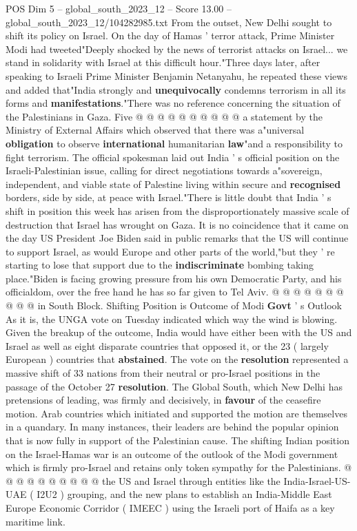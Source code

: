 \begin{textsample}{POS Dim 5 – global\_south\_2023\_12 – Score 13.00 – global\_south\_2023\_12/104282985.txt}
From the outset, New Delhi sought to shift its policy on Israel.
On the day of Hamas ' terror attack, Prime Minister Modi had tweeted"Deeply shocked by the news of terrorist attacks on Israel... we stand in solidarity with Israel at this difficult hour."Three days later, after speaking to Israeli Prime Minister Benjamin Netanyahu, he repeated these views and added that"India strongly and \textbf{unequivocally} condemns terrorism in all its forms and \textbf{manifestations}."There was no reference concerning the situation of the Palestinians in Gaza.
Five @ @ @ @ @ @ @ @ @ @ a statement by the Ministry of External Affairs which observed that there was a"universal \textbf{obligation} to observe \textbf{international} humanitarian \textbf{law}"and a responsibility to fight terrorism.
The official spokesman laid out India ' s official position on the Israeli-Palestinian issue, calling for direct negotiations towards a"sovereign, independent, and viable state of Palestine living within secure and \textbf{recognised} borders, side by side, at peace with Israel."There is little doubt that India ' s shift in position this week has arisen from the disproportionately massive scale of destruction that Israel has wrought on Gaza.
It is no coincidence that it came on the day US President Joe Biden said in public remarks that the US will continue to support Israel, as would Europe and other parts of the world,"but they ' re starting to lose that support due to the \textbf{indiscriminate} bombing taking place."Biden is facing growing pressure from his own Democratic Party, and his officialdom, over the free hand he has so far given to Tel Aviv. @ @ @ @ @ @ @ @ @ @ in South Block.
Shifting Position is Outcome of Modi \textbf{Govt} ' s Outlook As it is, the UNGA vote on Tuesday indicated which way the wind is blowing.
Given the breakup of the outcome, India would have either been with the US and Israel as well as eight disparate countries that opposed it, or the 23 ( largely European ) countries that \textbf{abstained}.
The vote on the \textbf{resolution} represented a massive shift of 33 nations from their neutral or pro-Israel positions in the passage of the October 27 \textbf{resolution}.
The Global South, which New Delhi has pretensions of leading, was firmly and decisively, in \textbf{favour} of the ceasefire motion.
Arab countries which initiated and supported the motion are themselves in a quandary.
In many instances, their leaders are behind the popular opinion that is now fully in support of the Palestinian cause.
The shifting Indian position on the Israel-Hamas war is an outcome of the outlook of the Modi government which is firmly pro-Israel and retains only token sympathy for the Palestinians. @ @ @ @ @ @ @ @ @ @ the US and Israel through entities like the India-Israel-US-UAE ( I2U2 ) grouping, and the new plans to establish an India-Middle East Europe Economic Corridor ( IMEEC ) using the Israeli port of Haifa as a key maritime link.

\end{textsample}
